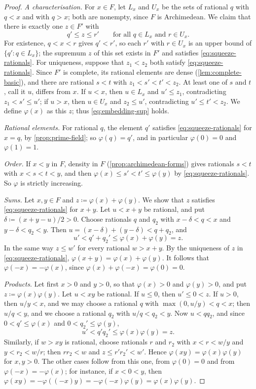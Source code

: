 \begin{proof}
\emph{A characterisation.} For $x\in F$, let $L_x$ and $U_x$ be the sets of rational $q$ with $q<x$ and with $q>x$; both are nonempty, since $F$ is Archimedean. We claim that there is exactly one $z\in F'$ with
\begin{equation}
q'\le z\le r'\qquad\text{for all }q\in L_x\text{ and }r\in U_x .
\label{eq:squeeze-rationals}
\end{equation}
For existence, $q<x<r$ gives $q'<r'$, so each $r'$ with $r\in U_x$ is an upper bound of $\{q': q\in L_x\}$; the supremum $z$ of this set exists in $F'$ and satisfies \eqref{eq:squeeze-rationals}. For uniqueness, suppose that $z_1<z_2$ both satisfy \eqref{eq:squeeze-rationals}. Since $F'$ is complete, its rational elements are dense (\cref{lem:complete-basic}), and there are rational $s<t$ with $z_1<s'<t'<z_2$. At least one of $s$ and $t$, call it $u$, differs from $x$. If $u<x$, then $u\in L_x$ and $u'\le z_1$, contradicting $z_1<s'\le u'$; if $u>x$, then $u\in U_x$ and $z_2\le u'$, contradicting $u'\le t'<z_2$. We define $\varphi(x)$ as this $z$; thus \eqref{eq:embedding-sup} holds.

\emph{Rational elements.} For rational $q$, the element $q'$ satisfies \eqref{eq:squeeze-rationals} for $x=q$, by \cref{prop:prime-field}; so $\varphi(q)=q'$, and in particular $\varphi(0)=0$ and $\varphi(1)=1$.

\emph{Order.} If $x<y$ in $F$, density in $F$ (\cref{prop:archimedean-forms}) gives rationals $s<t$ with $x<s<t<y$, and then $\varphi(x)\le s'<t'\le\varphi(y)$ by \eqref{eq:squeeze-rationals}. So $\varphi$ is strictly increasing.

\emph{Sums.} Let $x,y\in F$ and $z\coloneqq\varphi(x)+\varphi(y)$. We show that $z$ satisfies \eqref{eq:squeeze-rationals} for $x+y$. Let $u<x+y$ be rational, and put $\delta\coloneqq(x+y-u)/2>0$. Choose rationals $q$ and $q_2$ with $x-\delta<q<x$ and $y-\delta<q_2<y$. Then $u=(x-\delta)+(y-\delta)<q+q_2$, and
\[
u'<q'+q_2'\le\varphi(x)+\varphi(y)=z .
\]
In the same way $z\le w'$ for every rational $w>x+y$. By the uniqueness of $z$ in \eqref{eq:squeeze-rationals}, $\varphi(x+y)=\varphi(x)+\varphi(y)$. It follows that $\varphi(-x)=-\varphi(x)$, since $\varphi(x)+\varphi(-x)=\varphi(0)=0$.

\emph{Products.} Let first $x>0$ and $y>0$, so that $\varphi(x)>0$ and $\varphi(y)>0$, and put $z\coloneqq\varphi(x)\varphi(y)$. Let $u<xy$ be rational. If $u\le0$, then $u'\le0<z$. If $u>0$, then $u/y<x$, and we may choose a rational $q$ with $\max(0,u/y)<q<x$; then $u/q<y$, and we choose a rational $q_2$ with $u/q<q_2<y$. Now $u<qq_2$, and since $0<q'\le\varphi(x)$ and $0<q_2'\le\varphi(y)$,
\[
u'<q'q_2'\le\varphi(x)\varphi(y)=z .
\]
Similarly, if $w>xy$ is rational, choose rationals $r$ and $r_2$ with $x<r<w/y$ and $y<r_2<w/r$; then $rr_2<w$ and $z\le r'r_2'<w'$. Hence $\varphi(xy)=\varphi(x)\varphi(y)$ for $x,y>0$. The other cases follow from this one, from $\varphi(0)=0$ and from $\varphi(-x)=-\varphi(x)$; for instance, if $x<0<y$, then $\varphi(xy)=-\varphi((-x)y)=-\varphi(-x)\varphi(y)=\varphi(x)\varphi(y)$.


\end{proof}
